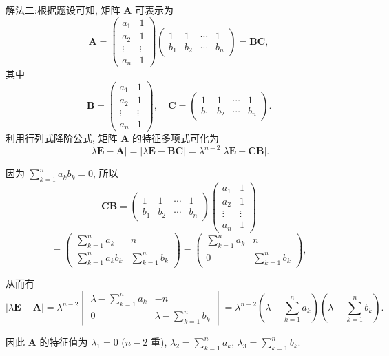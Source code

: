 \documentclass[../../main.tex]{subfiles}
\begin{document}
\begin{solution}
{\color{blue}解法二:}根据题设可知, 矩阵 $\boldsymbol{A}$ 可表示为
$$
\boldsymbol{A} = \begin{pmatrix} a_1 & 1 \\ a_2 & 1 \\ \vdots & \vdots \\ a_n & 1 \end{pmatrix} \begin{pmatrix} 1 & 1 & \cdots & 1 \\ b_1 & b_2 & \cdots & b_n \end{pmatrix} = \boldsymbol{B}\boldsymbol{C},
$$
其中
$$
\boldsymbol{B} = \begin{pmatrix} a_1 & 1 \\ a_2 & 1 \\ \vdots & \vdots \\ a_n & 1 \end{pmatrix}, \quad \boldsymbol{C} = \begin{pmatrix} 1 & 1 & \cdots & 1 \\ b_1 & b_2 & \cdots & b_n \end{pmatrix}.
$$
利用行列式降阶公式, 矩阵 $\boldsymbol{A}$ 的特征多项式可化为
$$
|\lambda\boldsymbol{E} - \boldsymbol{A}| = |\lambda\boldsymbol{E} - \boldsymbol{B}\boldsymbol{C}| = \lambda^{n - 2}|\lambda\boldsymbol{E} - \boldsymbol{C}\boldsymbol{B}|.
$$

因为 $\sum_{k = 1}^n a_kb_k = 0$, 所以
$$
\boldsymbol{C}\boldsymbol{B} = \begin{pmatrix} 1 & 1 & \cdots & 1 \\ b_1 & b_2 & \cdots & b_n \end{pmatrix} \begin{pmatrix} a_1 & 1 \\ a_2 & 1 \\ \vdots & \vdots \\ a_n & 1 \end{pmatrix}
$$
$$
= \begin{pmatrix} \sum_{k = 1}^n a_k & n \\ \sum_{k = 1}^n a_kb_k & \sum_{k = 1}^n b_k \end{pmatrix} = \begin{pmatrix} \sum_{k = 1}^n a_k & n \\ 0 & \sum_{k = 1}^n b_k \end{pmatrix},
$$

从而有
$$
|\lambda\boldsymbol{E} - \boldsymbol{A}| = \lambda^{n - 2} \begin{vmatrix} \lambda - \sum_{k = 1}^n a_k & -n \\ 0 & \lambda - \sum_{k = 1}^n b_k \end{vmatrix} = \lambda^{n - 2} \left( \lambda - \sum_{k = 1}^n a_k \right) \left( \lambda - \sum_{k = 1}^n b_k \right).
$$

因此 $\boldsymbol{A}$ 的特征值为 $\lambda_1 = 0$ ($n - 2$ 重), $\lambda_2 = \sum_{k = 1}^n a_k$, $\lambda_3 = \sum_{k = 1}^n b_k$.

\end{solution}
\end{document}

